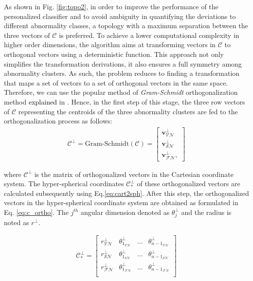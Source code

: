 As shown in Fig. \ref{fig:topo2}, in order to improve the performance of the personalized classifier and to avoid ambiguity in quantifying the deviations to different abnormality classes, a topology with a maximum separation between the three vectors of $\mathcal{C}$ is preferred. To achieve a lower computational complexity in higher order dimensions, the algorithm aims at transforming vectors in $\mathcal{C}$ to orthogonal vectors using a deterministic function. This approach not only simplifies the transformation derivations, it also ensures a full symmetry among abnormality clusters. As such, the problem reduces to finding a transformation that maps a set of vectors to a set of orthogonal vectors in the same space. Therefore, we can use the popular method of \textit{Gram-Schmidt} orthogonalization method \textcolor{black}{explained} in \cite{Gram-schmidth1, Gram-schmidth2}. Hence, in the first step of this stage, the three row vectors of $\mathcal{C}$ representing the centroids of the three abnormality clusters are fed to the orthogonalization process as follows:
\begin{align}
\mathcal{C}^{\perp}= \text{Gram-Schmidt}(\mathcal{C})
=
\begin{bmatrix}
\mathbf{v}_{\mathcal{VN}}^{\perp} \\
\mathbf{v}_{\mathcal{SN}}^{\perp} \\
\mathbf{v}_{\mathcal{FN}}^{\perp},
\end{bmatrix}
\end{align}

where $\mathcal{C}^{\perp}$ is the matrix of orthogonalized vectors in the Cartesian coordinate system. The hyper-spherical coordinates $\mathcal{C}^{\perp}_{*}$ of these orthogonalized vectors are calculated subsequently using Eq.\ref{eq:cart2sph}. After this step, the orthogonalized vectors in the hyper-spherical coordinate system are obtained as formulated in Eq. \ref{eq:c_ortho}. The $j^{th}$ angular dimension denoted as  $\theta_{j}^{\perp}$ and the radius is noted as $r^{\perp}$.%

\begin{align}
\label{eq:c_ortho}
\mathcal{C}^{\perp}_{*} =
\begin{bmatrix}
    r_{\mathcal{VN}}^{\perp} & \theta_{1_{\mathcal{VN}}}^{\perp} & \dots  & \theta_{{n-1}_{\mathcal{VN}}}^{\perp} \\
    r_{\mathcal{SN}}^{\perp} & \theta_{1_{\mathcal{SN}}}^{\perp} & \dots  & \theta_{{n-1}_{\mathcal{SN}}}^{\perp} \\
	r_{\mathcal{FN}}^{\perp} & \theta_{1_{\mathcal{FN}}}^{\perp} & \dots  & \theta_{{n-1}_{\mathcal{FN}}}^{\perp} \\
\end{bmatrix}
\end{align}


